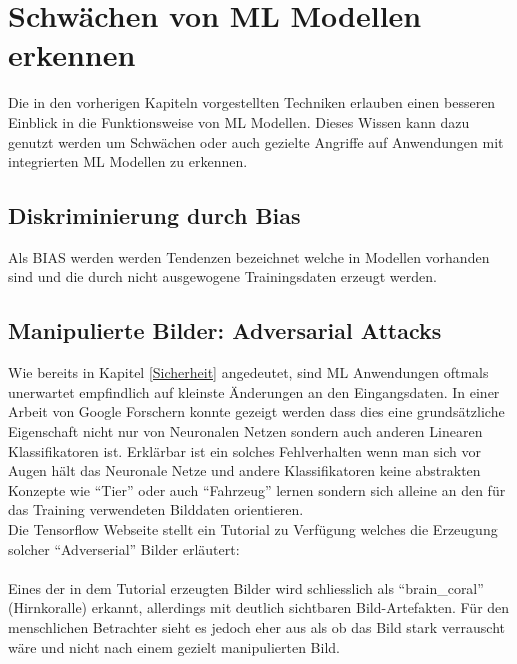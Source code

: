 \documentclass[
  12pt, %
  a4paper, %
  oneside, %
  openany, 
  numbers=noenddot, %
  BCOR=5mm, %
  parskip=half*, %
  thesis, %
]{bfhbook}
\begin{document}
\chapter{Schwächen von ML Modellen erkennen}
Die in den vorherigen Kapiteln vorgestellten Techniken erlauben einen besseren Einblick in die Funktionsweise von \Gls{ML} Modellen. Dieses Wissen kann dazu genutzt werden um Schwächen oder auch gezielte Angriffe auf Anwendungen mit integrierten \Gls{ML} Modellen zu erkennen.
\section{Diskriminierung durch Bias}
Als \Gls{BIAS} werden werden Tendenzen bezeichnet welche in Modellen vorhanden sind und die durch nicht ausgewogene Trainingsdaten erzeugt werden.
\parencite{msTay}
\section{Manipulierte Bilder: Adversarial Attacks}
Wie bereits in Kapitel \ref{Sicherheit} angedeutet, sind \Gls{ML} Anwendungen oftmals unerwartet empfindlich auf kleinste Änderungen an den Eingangsdaten. In einer Arbeit von Google Forschern   \parencite{Goodfellow2014} konnte gezeigt werden dass dies eine grundsätzliche Eigenschaft nicht nur von Neuronalen Netzen sondern auch anderen Linearen Klassifikatoren ist. Erklärbar ist ein solches Fehlverhalten wenn man sich vor Augen hält das Neuronale Netze und andere Klassifikatoren keine abstrakten Konzepte wie ``Tier'' oder auch ``Fahrzeug'' lernen sondern sich alleine an den für das Training verwendeten Bilddaten orientieren.\\
Die Tensorflow Webseite stellt ein Tutorial zu Verfügung welches die Erzeugung solcher ``Adverserial'' Bilder erläutert: \parencite{tensorflowFGSM}
\\ 
\\
Eines der in dem Tutorial erzeugten Bilder wird schliesslich als ``brain\_coral'' (Hirnkoralle) erkannt, allerdings mit deutlich sichtbaren Bild-Artefakten. Für den menschlichen Betrachter sieht es jedoch eher aus als ob das Bild stark verrauscht wäre und nicht nach einem gezielt manipulierten Bild.
\end{document}
